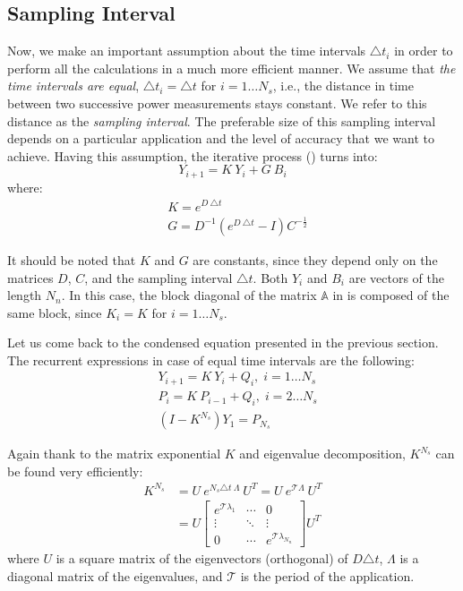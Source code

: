 \subsection{Sampling Interval}
Now, we make an important assumption about the time intervals $\triangle t_i$ in order to perform all the calculations in a much more efficient manner. We assume that \emph{the time intervals are equal}, $\triangle t_i = \triangle t$ for $i = 1 \dots N_s$, i.e., the distance in time between two successive power measurements stays constant. We refer to this distance as the \emph{sampling interval}. The preferable size of this sampling interval depends on a particular application and the level of accuracy that we want to achieve. Having this assumption, the iterative process () turns into:
\[
  Y_{i+1} = K \: Y_i + G \: B_i
\]
where:
\begin{align*}
  & K = e^{D \: \triangle t} \\
  & G = D^{-1} \left( e^{D \: \triangle t} - I \right) C^{-\frac{1}{2}}
\end{align*}

It should be noted that $K$ and $G$ are constants, since they depend only on the matrices $D$, $C$, and the sampling interval $\triangle t$. Both $Y_i$ and $B_i$ are vectors of the length $N_n$. In this case, the block diagonal of the matrix $\mathbb{A}$ in  is composed of the same block, since $K_i = K$ for $i = 1 \dots N_s$.

Let us come back to the condensed equation presented in the previous section. The recurrent expressions in case of equal time intervals are the following:
\begin{align}
  & Y_{i + 1} = K \: Y_i + Q_i, \; i = 1 \dots N_s \nonumber \\
  & P_i = K \: P_{i - 1} + Q_i, \; i = 2 \dots N_s \nonumber \\
  & (I - K^{N_s}) Y_1 = P_{N_s} \label{eq:linear-system}
\end{align}

Again thank to the matrix exponential $K$ and eigenvalue decomposition, $K^{N_s}$ can be found very efficiently:
\begin{align*}
  K^{N_s} & = U \: e^{N_s \triangle t \: \Lambda} \: U^T = U \: e^{\mathcal{T} \Lambda} \: U^T \\
    & = U \left[
      \begin{array}{ccc}
        e^{\mathcal{T} \lambda_1} & \cdots & 0 \\
        \vdots & \ddots & \vdots \\
        0 & \cdots & e^{\mathcal{T} \lambda_{N_n}}
      \end{array}
    \right] U^T
\end{align*}
where $U$ is a square matrix of the eigenvectors (orthogonal) of $D \triangle t$, $\Lambda$ is a diagonal matrix of the eigenvalues, and $\mathcal{T}$ is the period of the application.

